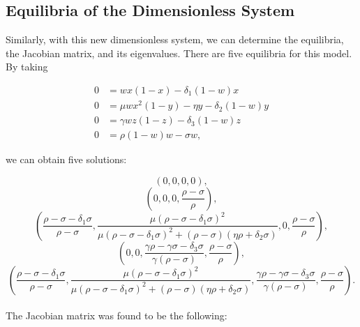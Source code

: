 \documentclass[12pt]{article}
\begin{document}
\vspace{.5in}

\subsection{Equilibria of the Dimensionless System}
\indent\indent Similarly, with this new dimensionless system, we can determine the equilibria, the Jacobian matrix, and its eigenvalues. There are five equilibria for this model. By taking  

\begin{align*}
    0 &= w x (1-x) - \delta_1 (1-w) x \\
    0 &= \mu w x^2 (1-y) - \eta y - \delta_2 (1-w) y \\
    0 &= \gamma w z (1-z) - \delta_3 (1-w) z \\
    0 &= \rho (1-w) w - \sigma w,
\end{align*}

\noindent we can obtain five solutions:

\begin{equation}
    \left(0,0,0,0\right),
\end{equation}
\begin{equation}
    \left(0,0,0, \frac{\rho - \sigma}{\rho}\right),
\end{equation}
\begin{equation}
    \left(\frac{\rho - \sigma - \delta_1 \sigma}{\rho - \sigma}, \frac{\mu (\rho - \sigma - \delta_1 \sigma)^2}{\mu (\rho - \sigma - \delta_1 \sigma)^2 + (\rho - \sigma)(\eta \rho + \delta_2 \sigma)}, 0, \frac{\rho - \sigma}{\rho} \right), 
\end{equation}
\begin{equation}
    \left(0,0, \frac{\gamma \rho - \gamma \sigma - \delta_3 \sigma}{\gamma (\rho - \sigma)}, \frac{\rho - \sigma}{\rho} \right),
\end{equation}
\begin{equation}
    \left (\frac{\rho - \sigma - \delta_1 \sigma}{\rho - \sigma}, \frac{ \mu (\rho - \sigma - \delta_1 \sigma)^2}{\mu (\rho - \sigma - \delta_1 \sigma)^2 + (\rho - \sigma)(\eta \rho + \delta_2 \sigma)}, \frac{\gamma \rho - \gamma \sigma - \delta_3 \sigma}{\gamma (\rho - \sigma)}, \frac{\rho - \sigma}{\rho} \right).
\end{equation}\\

\noindent The Jacobian matrix was found to be the following:\\
\end{document}
